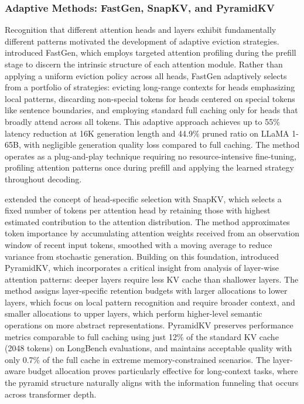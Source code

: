 \subsubsection{Adaptive Methods: FastGen, SnapKV, and PyramidKV}

Recognition that different attention heads and layers exhibit fundamentally different patterns motivated the development of adaptive eviction strategies. \citet{ge2024model} introduced FastGen, which employs targeted attention profiling during the prefill stage to discern the intrinsic structure of each attention module. Rather than applying a uniform eviction policy across all heads, FastGen adaptively selects from a portfolio of strategies: evicting long-range contexts for heads emphasizing local patterns, discarding non-special tokens for heads centered on special tokens like sentence boundaries, and employing standard full caching only for heads that broadly attend across all tokens. This adaptive approach achieves up to 55\% latency reduction at 16K generation length and 44.9\% pruned ratio on LLaMA 1-65B, with negligible generation quality loss compared to full caching. The method operates as a plug-and-play technique requiring no resource-intensive fine-tuning, profiling attention patterns once during prefill and applying the learned strategy throughout decoding.

\citet{li2024snapkv} extended the concept of head-specific selection with SnapKV, which selects a fixed number of tokens per attention head by retaining those with highest estimated contribution to the attention distribution. The method approximates token importance by accumulating attention weights received from an observation window of recent input tokens, smoothed with a moving average to reduce variance from stochastic generation. Building on this foundation, \citet{cai2024pyramidkv} introduced PyramidKV, which incorporates a critical insight from analysis of layer-wise attention patterns: deeper layers require less KV cache than shallower layers. The method assigns layer-specific retention budgets with larger allocations to lower layers, which focus on local pattern recognition and require broader context, and smaller allocations to upper layers, which perform higher-level semantic operations on more abstract representations. PyramidKV preserves performance metrics comparable to full caching using just 12\% of the standard KV cache (2048 tokens) on LongBench evaluations, and maintains acceptable quality with only 0.7\% of the full cache in extreme memory-constrained scenarios. The layer-aware budget allocation proves particularly effective for long-context tasks, where the pyramid structure naturally aligns with the information funneling that occurs across transformer depth.

